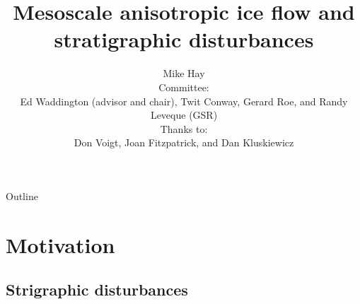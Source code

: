 \documentclass{beamer}
\title[Ice anisotropy] %
{Mesoscale anisotropic ice flow and stratigraphic disturbances}
\author[Michael Hay] %
{ 
  Mike Hay \inst{1}\\
  \footnotesize{
    Committee:\\
    Ed Waddington (advisor and chair),  Twit Conway, Gerard Roe, and Randy Leveque (GSR)\\
    Thanks to:\\
    Don Voigt, Joan Fitzpatrick, and Dan Kluskiewicz
    }
  }
\institute[University of Washington] %
{
  \inst{1}%
  Department of Earth and Space Sciences\\
  University of Washington
  \and
  }
\date[CFP 2003] %
\begin{document}
\begin{frame}
  \titlepage
\end{frame}

\begin{frame}{Outline}
  \tableofcontents
\end{frame}





\section{Motivation}

\subsection{Strigraphic disturbances}
\end{document}
